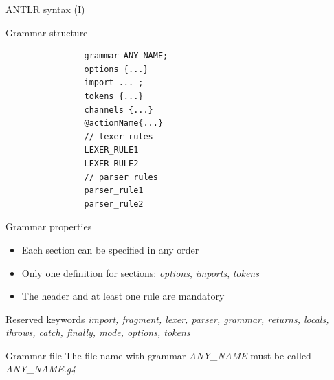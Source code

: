 \documentclass{beamer}
\begin{document}
\begin{frame}[fragile]{ANTLR syntax (I)}

	\begin{minipage}[t]{0.3\textwidth}
		\begin{exampleblock}{Grammar structure}		
			\footnotesize
			\begin{lstlisting}
				grammar ANY_NAME;
				options {...}
				import ... ;
				tokens {...}
				channels {...}
				@actionName{...}
				// lexer rules
				LEXER_RULE1
				LEXER_RULE2
				// parser rules
				parser_rule1
				parser_rule2			
			\end{lstlisting}
		\end{exampleblock}
	\end{minipage}
	\noindent\hfill
	\begin{minipage}[t]{0.65\textwidth}
		\begin{block}{Grammar properties}
			\begin{itemize}
				\item Each section can be specified in any order
				\item Only one definition for sections: \textit{options}, \textit{imports}, \textit{tokens}
				\item The header and at least one rule are mandatory
			\end{itemize}
		\end{block}

			\begin{alertblock}{Reserved keywords}
				\textit{import, fragment, lexer, parser, grammar, returns, locals, throws, catch, finally, mode, options, tokens}
			\end{alertblock}
			
	\end{minipage}
		\begin{alertblock}{Grammar file}
			The file name with grammar \textit{ANY\_NAME} must be called \textit{ANY\_NAME.g4}
		\end{alertblock}	

\end{frame}
\end{document}
